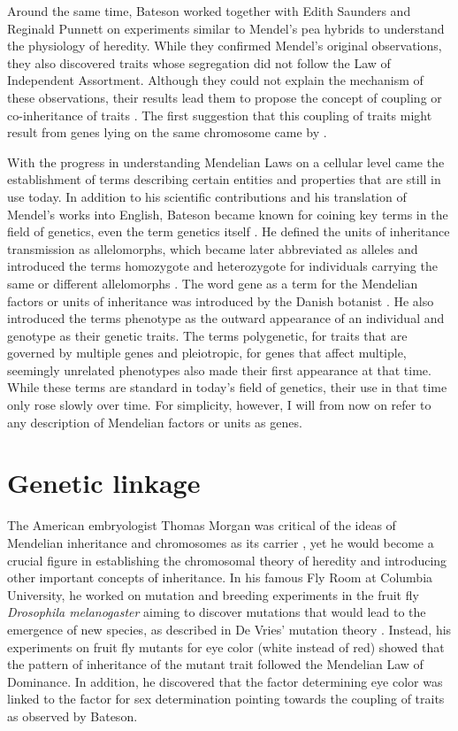 Around the same time, Bateson worked together with Edith Saunders and Reginald Punnett on experiments similar to Mendel's pea hybrids to understand the physiology of heredity. While they confirmed Mendel's original observations, they also discovered traits whose segregation did not follow the Law of Independent Assortment. Although they could not explain the mechanism of these observations, their results lead them to propose the concept of coupling or co-inheritance of traits \citep{Bateson1905}. The first suggestion that this coupling of traits might result from genes lying on the same chromosome came by \citet{Lock1906,Edwards2013}. 

With the progress in understanding Mendelian Laws on a cellular level came the establishment of terms describing certain entities and properties that are still in use today. In addition to his scientific contributions and his translation of Mendel's works into English, Bateson became known for coining key terms in the field of genetics, even the term genetics itself \citep{Dunwell2007}. He defined the units of inheritance transmission as allelomorphs, which became later abbreviated as alleles and introduced the terms homozygote and heterozygote for individuals carrying the same or different allelomorphs \citep{Bateson1902}. The word gene as a term for the Mendelian factors or units of inheritance was introduced by the Danish botanist \citet{Johannsen1911}. He also introduced the terms phenotype as the outward appearance of an individual and genotype as their genetic traits. The terms polygenetic, for traits that are governed by multiple genes \citep{East1910} and pleiotropic, for genes that affect multiple, seemingly unrelated phenotypes \citep[page 597]{Plate1910} also made their first appearance at that time. While these terms are standard in today's field of genetics, their use in that time only rose slowly over time. For simplicity, however, I will from now on refer to any description of Mendelian factors or units as genes. 

\section{Genetic linkage}
The American embryologist Thomas Morgan was critical of the ideas of Mendelian inheritance and chromosomes as its carrier \citep{Allen1968}, yet he would become a crucial figure in establishing the chromosomal theory of heredity and introducing other important concepts of inheritance. In his famous Fly Room at Columbia University, he worked on mutation and breeding experiments in the fruit fly \textit{Drosophila melanogaster} aiming to discover mutations that would lead to the emergence of new species, as described in De Vries' mutation theory \citep{Allen1968}. Instead, his experiments on fruit fly mutants for eye color (white instead of red) showed that the pattern of inheritance of the mutant trait followed the Mendelian Law of Dominance. In addition, he discovered that the factor determining eye color was linked to the factor for sex determination \citep{Morgan1910,Morgan1911a} pointing towards the coupling of traits as observed by Bateson.

